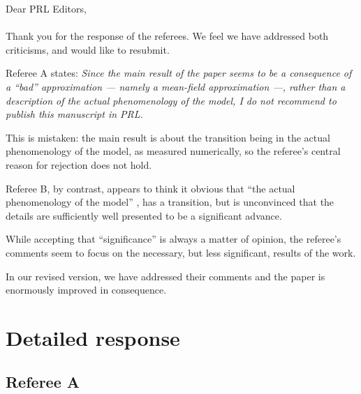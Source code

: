 \documentclass[a4paper,10pt]{article}
\title{}
\author{Joshua DM Hellier and Graeme J Ackland}
\begin{document}
\maketitle

 Dear PRL Editors,
 \\
 \\
  Thank you for the response of the referees. We feel we have
  addressed both criticisms, and would like to resubmit.
 
  Referee A states:
{\it  Since the main result of the paper seems to be a consequence of a ``bad'' approximation --- namely a mean-field approximation ---, rather than a description of the actual phenomenology of the model, I do not recommend to publish this manuscript in PRL.}

  This is mistaken: the main result is about the transition being in the actual phenomenology of the model, as measured numerically, so the referee's central reason for rejection does not hold.
 
  Referee B, by contrast, appears to think it obvious that ``the actual phenomenology of the model'' , has a transition, but is unconvinced that the details are sufficiently well presented to be a significant advance.

 While accepting that ``significance'' is always a matter of opinion,
 the referee's comments seem to focus on the necessary, but less
 significant, results of the work.
 
 
In our revised version, we have addressed their comments and the paper is enormously improved in consequence.
 
 
\section*{Detailed response}


   \subsection*{Referee A}
  
\end{document}
